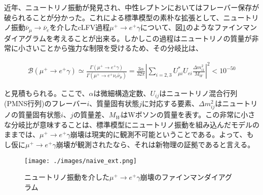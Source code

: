 \documentclass[Yonemoto_master.tex]{subfiles}
\begin{document}

近年、ニュートリノ振動が発見され\cite{nu_osc}、中性レプトンにおいてはフレーバー保存が破られることが分かった。これによる標準模型の素朴な拡張として、ニュートリノ振動$\bar{\nu}_{\mu} \to \bar{\nu}_{e}$を介したcLFV過程$\mu^+ \to e^+ \gamma$について、図\ref{fig: naive_ext}のようなファインマンダイアグラムを考えることが出来る。しかしこの過程はニュートリノの質量が非常に小さいことから強力な制限を受けるため、その分岐比は、

\begin{align}
\mathcal{B}(\mu^+ \to e^+ \gamma) \simeq \frac{\Gamma(\mu^+ \to e^+ \gamma)}{\Gamma(\mu^+ \to e^+\nu_e\bar{\nu}_{\mu})} = \frac{3\alpha}{32\pi} \left|\sum_{i=2,3}U^*_{\mu i}U_{ei}\frac{\Delta m^2_{i1}}{M_W}\right|^2 < 10^{-50}
\end{align}

\noindent と見積もられる\cite{rare_lep}。ここで、$\alpha$は微細構造定数、$U_{ij}$はニュートリノ混合行列(PMNS行列)のフレーバー$i$、質量固有状態$j$に対応する要素、$\Delta m^2_{ij}$はニュートリノの質量固有状態$i$、$j$の質量差、$M_W$はWボソンの質量を表す。この非常に小さな分岐比が意味することは、標準模型にニュートリノ振動を組み込んだモデルのままでは、$\mu^+ \to e^+ \gamma$崩壊は現実的に観測不可能ということである。よって、もし仮に$\mu^+ \to e^+ \gamma$崩壊が観測されたなら、それは新物理の証拠であると言える。

\begin{figure}[h]
\begin{center}
\texttt{[image: ./images/naive\_ext.png]}
\caption{ニュートリノ振動を介した$\mu^+ \to e^+ \gamma$崩壊のファインマンダイアグラム}
\label{fig: naive_ext}
\end{center}
\end{figure}
\end{document}
